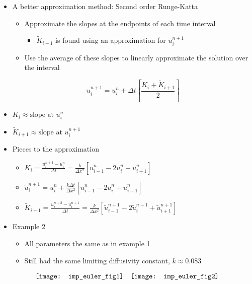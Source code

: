 \documentclass[compress]{beamer}
\begin{document}
\begin{frame}
\begin{itemize}
\item A better approximation method: Second order Runge-Katta 
\begin{itemize}
\item Approximate the slopes at the endpoints of each time interval
\begin{itemize}
\item $\widetilde{K}_{i+1}$ is found using an approximation for $u_i^{n+1}$
\end{itemize}
\item Use the average of these slopes to linearly approximate the solution over the interval
\end{itemize}

$$u_i^{n+1}=u_i^n+\Delta t\left[\frac{K_{i}+\widetilde{K}_{i+1} }{2}\right]$$
\item $K_{i}\approx \text{slope at $u_i^n$}$
\item $\widetilde{K}_{i+1}\approx \text{slope at $u_i^{n+1}$}$
\end{itemize}
\end{frame}

\begin{frame}
\begin{itemize}
\item Pieces to the approximation
\vspace{.2in}

\begin{itemize}
\item $K_{i}=\frac{u_i^{n+1}-u_i^n}{\Delta t}=\frac{k}{\Delta x^2}\left[u_{i-1}^n-2u_i^n+u_{i+1}^n\right]$
\vspace{.2in}

\item $\tilde{u}_i^{n+1}=u_i^{n}+\frac{k\Delta t}{\Delta x^2}\left[u_{i-1}^n-2u_i^n+u_{i+1}^n\right]$
\vspace{.2in}

\item $\widetilde{K}_{i+1}=\frac{u_{i}^{n+2}-u_i^{n+1}}{\Delta t}=\frac{k}{\Delta x^2}\left[\tilde{u}_{i-1}^{n+1}-2\tilde{u}_i^{n+1}+\tilde{u}_{i+1}^{n+1}\right]$
\end{itemize}
\end{itemize}
\end{frame}

\begin{frame}
\begin{itemize}
\item Example 2
\begin{itemize}
\item All parameters the same as in example 1
\item Still had the same limiting diffusivity constant, $k\approx 0.083$ 
\end{itemize}
\end{itemize}
\[
\begin{array}{c c}
\texttt{[image: imp\_euler\_fig1]} 	&	\texttt{[image: imp\_euler\_fig2]} 	
\end{array}	
\]
\end{frame}
\end{document}
